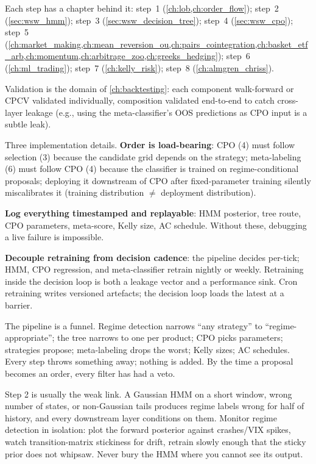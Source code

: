 Each step has a chapter behind it: step~1
(\cref{ch:lob,ch:order_flow}); step~2 (\cref{sec:wsw_hmm});
step~3 (\cref{sec:wsw_decision_tree}); step~4
(\cref{sec:wsw_cpo}); step~5
(\cref{ch:market_making,ch:mean_reversion_ou,ch:pairs_cointegration,ch:basket_etf_arb,ch:momentum,ch:arbitrage_zoo,ch:greeks_hedging});
step~6 (\cref{ch:ml_trading}); step~7 (\cref{ch:kelly_risk});
step~8 (\cref{ch:almgren_chriss}).

Validation is the domain of \cref{ch:backtesting}: each component
walk-forward or CPCV validated individually, composition validated
end-to-end to catch cross-layer leakage (e.g., using the
meta-classifier's OOS predictions as CPO input is a subtle leak).

Three implementation details. \textbf{Order is load-bearing}: CPO
(4) must follow selection (3) because the candidate grid depends
on the strategy; meta-labeling (6) must follow CPO (4) because the
classifier is trained on regime-conditional proposals; deploying
it downstream of CPO after fixed-parameter training silently
miscalibrates it (training distribution $\neq$ deployment
distribution).

\textbf{Log everything timestamped and replayable}: HMM posterior,
tree route, CPO parameters, meta-score, Kelly size, AC schedule.
Without these, debugging a live failure is impossible.

\textbf{Decouple retraining from decision cadence}: the pipeline
decides per-tick; HMM, CPO regression, and meta-classifier retrain
nightly or weekly. Retraining inside the decision loop is both a
leakage vector and a performance sink. Cron retraining writes
versioned artefacts; the decision loop loads the latest at a
barrier.

\begin{intuitionbox}
The pipeline is a funnel. Regime detection narrows ``any strategy''
to ``regime-appropriate''; the tree narrows to one per product; CPO
picks parameters; strategies propose; meta-labeling drops the
worst; Kelly sizes; AC schedules. Every step throws something
away; nothing is added. By the time a proposal becomes an order,
every filter has had a veto.
\end{intuitionbox}

\begin{pitfallbox}
Step 2 is usually the weak link. A Gaussian HMM on a short window,
wrong number of states, or non-Gaussian tails produces regime
labels wrong for half of history, and every downstream layer
conditions on them. Monitor regime detection in isolation: plot
the forward posterior against crashes/VIX spikes, watch
transition-matrix stickiness for drift, retrain slowly enough that
the sticky prior does not whipsaw. Never bury the HMM where you
cannot see its output.
\end{pitfallbox}

